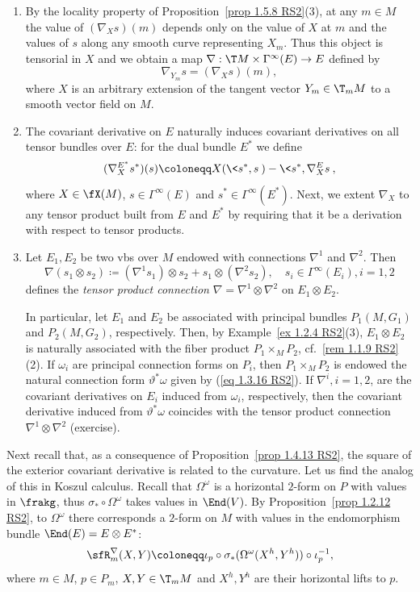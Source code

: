 \begin{rem}\label{rem 1.5.9 RS2}
    \begin{enumerate}
        \item By the locality property of Proposition~\ref{prop 1.5.8 RS2}(3), at any $m\in M$ the value of $(\nabla_X s)(m)$ depends only on the value of $X$ at $m$ and the values of $s$ along any smooth curve representing $X_m$. Thus this object is tensorial in $X$ and we obtain a map $\nabla:\T M\times\Gamma^\infty(E)\to E$ defined by
        \[\nabla_{Y_m}s=(\nabla_X s)(m),\]
        where $X$ is an arbitrary extension of the tangent vector $Y_m\in \T_mM$ to a smooth vector field on $M$.
        \item The covariant derivative on $E$ naturally induces covariant derivatives on all tensor bundles over $E$: for the dual bundle $E^\ast$ we define
        \[(\nabla^{E^\ast}_X s^\ast)(s)\coloneqq X(\<s^\ast,s\>)-\<s^\ast,\nabla_X^E s\>,\]
        where $X\in\fX(M)$, $s\in\Gamma^\infty(E)$ and $s^\ast\in\Gamma^\infty(E^\ast)$. Next, we extent $\nabla_X$ to any tensor product built from $E$ and $E^\ast$ by requiring that it be a derivation with respect to tensor products.
        \item Let $E_1,E_2$ be two \glspl{vb} over $M$ endowed with connections $\nabla^1$ and $\nabla^2$. Then
        \[\nabla(s_1\otimes s_2)\coloneqq (\nabla^1 s_1)\otimes s_2+s_1\otimes (\nabla^2 s_2), \quad s_i\in\Gamma^\infty(E_i),i=1,2\]
        defines the \emph{tensor product connection} $\nabla=\nabla^1\otimes\nabla^2$ on $E_1\otimes E_2$.

        In particular, let $E_1$ and $E_2$ be associated with principal bundles $P_1(M,G_1)$ and $P_2(M,G_2)$, respectively. Then, by Example~\ref{ex 1.2.4 RS2}(3), $E_1\otimes E_2$ is naturally associated with the fiber product $P_1\times_M P_2$, cf.\ \ref{rem 1.1.9 RS2}(2). If $\omega_i$ are principal connection forms on $P_i$, then $P_1\times_M P_2$ is endowed the natural connection form $\vartheta^\ast\omega$ given by (\ref{eq 1.3.16 RS2}). If $\nabla^i,i=1,2$, are the covariant derivatives on $E_i$ induced from $\omega_i$, respectively, then the covariant derivative induced from $\vartheta^\ast\omega$ coincides with the tensor product connection $\nabla^1\otimes \nabla^2$ (exercise).
    \end{enumerate}
\end{rem}

Next recall that, as a consequence of Proposition~\ref{prop 1.4.13 RS2}, the square of the exterior covariant derivative is related to the curvature. Let us find the analog of this in Koszul calculus. Recall that $\Omega^\omega$ is a horizontal $2$-form on $P$ with values in $\frakg$, thus $\sigma_\ast\circ \Omega^\omega$ takes values in $\End(V)$. By Proposition~\ref{prop 1.2.12 RS2}, to $\Omega^\omega$ there corresponds a $2$-form on $M$ with values in the endomorphism bundle $\End(E)=E\otimes E^\ast$:
\[\sfR^\nabla_m(X,Y)\coloneqq \iota_p\circ \sigma_\ast(\Omega^\omega(X^h,Y^h))\circ\iota_p^{-1},\label{eq def Rnabla}\]
where $m\in M$, $p\in P_m$, $X,Y\in \T_mM$ and $X^h,Y^h$ are their horizontal lifts to $p$.

